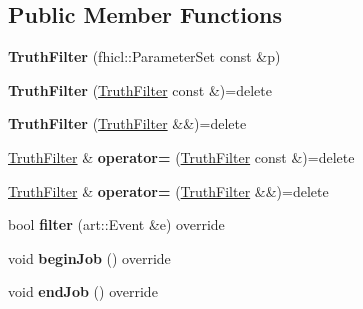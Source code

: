 \subsection*{Public Member Functions}
\begin{DoxyCompactItemize}
\item 
\hypertarget{classTruthFilter_ac78d452c321386fa30dd021a1498e6d7}{{\bfseries Truth\-Filter} (fhicl\-::\-Parameter\-Set const \&p)}\label{classTruthFilter_ac78d452c321386fa30dd021a1498e6d7}

\item 
\hypertarget{classTruthFilter_a3bb3577f75d6de9e0bd2cbaf9b51fb3a}{{\bfseries Truth\-Filter} (\hyperlink{classTruthFilter}{Truth\-Filter} const \&)=delete}\label{classTruthFilter_a3bb3577f75d6de9e0bd2cbaf9b51fb3a}

\item 
\hypertarget{classTruthFilter_a634dcfa981c7b34b202a825c7f550ea2}{{\bfseries Truth\-Filter} (\hyperlink{classTruthFilter}{Truth\-Filter} \&\&)=delete}\label{classTruthFilter_a634dcfa981c7b34b202a825c7f550ea2}

\item 
\hypertarget{classTruthFilter_adf7a3c444198d4b2ea0450a29a6ebe8a}{\hyperlink{classTruthFilter}{Truth\-Filter} \& {\bfseries operator=} (\hyperlink{classTruthFilter}{Truth\-Filter} const \&)=delete}\label{classTruthFilter_adf7a3c444198d4b2ea0450a29a6ebe8a}

\item 
\hypertarget{classTruthFilter_a890d5add6632b2be43406dd075ac707e}{\hyperlink{classTruthFilter}{Truth\-Filter} \& {\bfseries operator=} (\hyperlink{classTruthFilter}{Truth\-Filter} \&\&)=delete}\label{classTruthFilter_a890d5add6632b2be43406dd075ac707e}

\item 
\hypertarget{classTruthFilter_a2e4f8564b410b41b253527bec0879a72}{bool {\bfseries filter} (art\-::\-Event \&e) override}\label{classTruthFilter_a2e4f8564b410b41b253527bec0879a72}

\item 
\hypertarget{classTruthFilter_a1ef8e6334b66ae5433e92f4b18a528a1}{void {\bfseries begin\-Job} () override}\label{classTruthFilter_a1ef8e6334b66ae5433e92f4b18a528a1}

\item 
\hypertarget{classTruthFilter_a2f817fb39d4f66f406557ba0aa50727c}{void {\bfseries end\-Job} () override}\label{classTruthFilter_a2f817fb39d4f66f406557ba0aa50727c}

\end{DoxyCompactItemize}
